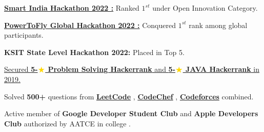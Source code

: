   \vspace{2pt}
  \resumeSubHeadingListStart
    \small{\item{
        \href{https://drive.google.com/file/d/16XJKFH-bSwnAHbmFzYKzYG1GUU_2-Bfo/view?usp=share_link}{\textbf{Smart India Hackathon 2022 :}}{ Ranked $1^{st}$ under Open Innovation Category.} \\ \vspace{3pt}
        
        \href{https://drive.google.com/file/d/1HNOxlnvIxcVDZ6r7I9YBmwxJD-tydV42/view?usp=share_link}{\textbf{PowerToFly Global Hackathon 2022 :}}{ Conquered $1^{st}$ rank among global participants.} \\ \vspace{3pt}
        
        \textbf{KSIT State Level Hackathon 2022:}{ Placed in Top 5.} \\ \vspace{3pt}
        
        \href{https://www.hackerrank.com/Devil_Hi}{Secured\textbf{ 5-$\textcolor{gold}\bigstar$ Problem Solving Hackerrank} and \textbf{5-$\textcolor{gold}\bigstar$ JAVA Hackerrank} in 2019.} \\ \vspace{3pt}
        
        Solved \textbf{500+} questions from \href{https://leetcode.com/DevilxMORTAL/}{\textbf{LeetCode}} , \href{https://www.codechef.com/users/devil7hi}{\textbf{CodeChef}} , \href{https://codeforces.com/profile/DevilxMORTAL}{\textbf{Codeforces}} combined. \\ \vspace{3pt}
        
        Active member of \textbf{Google Developer Student Club} and \textbf{Apple Developers Club} authorized by AATCE in college .
    }}
  \resumeSubHeadingListEnd

